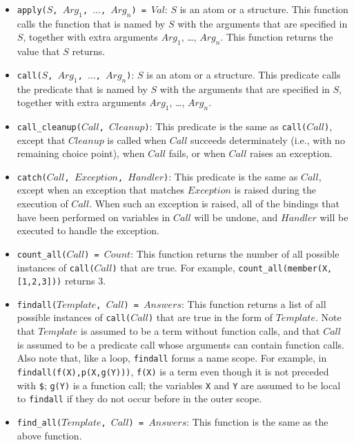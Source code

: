 \begin{itemize}
\item \texttt{apply($S$, $Arg_1$, $\ldots$, $Arg_n$) = $Val$}:   $S$ is an atom or a structure.  This function calls the function that is named by $S$ with the arguments that are specified in $S$, together with extra arguments $Arg_1$, \ldots, $Arg_n$.  This function returns the value that $S$ returns.
\item \texttt{call($S$, $Arg_1$, $\ldots$, $Arg_n$)}:  $S$ is an atom or a structure.  This predicate calls the predicate that is named by $S$ with the arguments that are specified in $S$, together with extra arguments $Arg_1$, \ldots, $Arg_n$.
\item \texttt{call\_cleanup($Call$, $Cleanup$)}: This predicate is the same as \texttt{call($Call$)}, except that \texttt{$Cleanup$} is called when \texttt{$Call$} succeeds determinately (i.e., with no remaining choice point), when \texttt{$Call$} fails, or when \texttt{$Call$} raises an exception.
\item \texttt{catch($Call$, $Exception$, $Handler$)}: This predicate is the same as $Call$, except when an exception that matches $Exception$ is raised during the execution of $Call$. When such an exception is raised, all of the bindings that have been performed on variables in \texttt{$Call$} will be undone, and \texttt{$Handler$} will be executed to handle the exception.
\item \texttt{count\_all($Call$) = $Count$}: This function returns the number of all possible instances of \texttt{call($Call$)} that are true. For example, \texttt{count\_all(member(X,[1,2,3]))} returns 3.
\item \texttt{findall($Template$, $Call$) = $Answers$}: This function returns a list of all possible instances of \texttt{call($Call$)} that are true in the form of $Template$. Note that $Template$ is assumed to be a term without function calls, and that $Call$ is assumed to be a predicate call whose arguments can contain function calls. Also note that, like a loop, \texttt{findall} forms a name scope. For example, in \texttt{findall(f(X),p(X,g(Y)))}, \texttt{f(X)} is a term even though it is not preceded with \verb+$+; \texttt{g(Y)} is a function call; the variables \texttt{X} and \texttt{Y} are assumed to be local to \texttt{findall} if they do not occur before in the outer scope.
\item \texttt{find\_all($Template$, $Call$) = $Answers$}: This function is the same as the above function.

\end{itemize}

